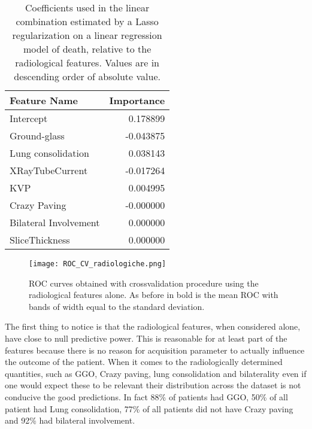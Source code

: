 \begin{table}
	\caption{Coefficients used in the linear combination estimated by a Lasso regularization on a linear regression model of death, relative to the radiological features. Values are in descending order of absolute value. \label{tab:ParamRadiologiche}}
		\centering
			\begin{tabular}{lr}
			\toprule
			Feature Name &  Importance \\
			\midrule
			Intercept             &                      0.178899 \\
			Ground-glass          &                     -0.043875 \\
			Lung consolidation    &                      0.038143 \\
			XRayTubeCurrent       &                     -0.017264 \\
			KVP                   &                      0.004995 \\
			Crazy Paving          &                     -0.000000 \\
			Bilateral Involvement &                      0.000000 \\
			SliceThickness        &                      0.000000 \\
			\bottomrule
			\end{tabular}
\end{table}

\begin{figure}[htbp]
	\centering
  		\texttt{[image: ROC\_CV\_radiologiche.png]}
        \caption{ROC curves obtained with crossvalidation procedure using the radiological features alone. As before  in bold is the mean ROC with bands of width equal to the standard deviation.\label{fig:RocDeathRadiologiche}}
\end{figure}

The first thing to notice is that the radiological features, when considered alone, have close to null predictive power. 
This is reasonable for at least part of the features because there is no reason for acquisition parameter to actually influence the outcome of the patient. 
 When it comes to the radiologically determined quantities, such as GGO, Crazy paving, lung consolidation and bilaterality even if one would expect these to be relevant their distribution across the dataset is not conducive the good predictions.
 In fact 88\% of patients had GGO, 50\% of all patient had Lung consolidation, 77\% of all patients did not have Crazy paving and 92\% had bilateral involvement.

